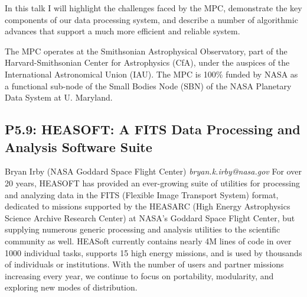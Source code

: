 \documentclass{report}
\begin{document}
In this talk I will highlight the challenges faced by the MPC, demonstrate
the key components of our data processing system, and describe a
number of algorithmic advances that support a much more efficient and
reliable system.

The MPC operates at the Smithsonian Astrophysical Observatory, part of
the Harvard-Smithsonian Center for Astrophysics (CfA), under the
auspices of the International Astronomical Union (IAU). The MPC is
100\% funded by NASA as a functional sub-node of the Small Bodies Node
(SBN) of the NASA Planetary Data System at U. Maryland.\newline
\newpage
\subsection*{P5.9: HEASOFT: A FITS Data Processing and Analysis Software Suite}
\bigskip
Bryan Irby (NASA Goddard Space Flight Center) \newline   \newline   \newline   \newline  \newline  \newline\newline
{\it bryan.k.irby@nasa.gov}\newline
\newline\newline
For over 20 years, HEASOFT has provided an ever-growing suite of utilities for processing and analyzing data in the FITS (Flexible Image Transport System) format, dedicated to missions supported by the HEASARC (High Energy Astrophysics Science Archive Research Center) at NASA's Goddard Space Flight Center, but supplying numerous generic processing and analysis utilities to the scientific community as well.  HEASoft currently contains nearly 4M lines of code in over 1000 individual tasks, supports 15 high energy missions, and is used by thousands of individuals or institutions.  With the number of users and partner missions increasing every year, we continue to focus on portability, modularity, and exploring new modes of distribution.\newline
\newpage
\end{document}
